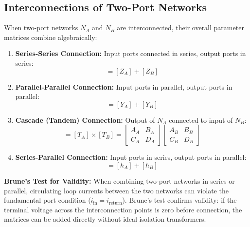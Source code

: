 \documentclass[12pt,a4paper]{article}
\begin{document}
\subsection{Interconnections of Two-Port Networks}

When two-port networks $N_A$ and $N_B$ are interconnected, their overall parameter matrices combine algebraically:

\begin{tcolorbox}[defbox, title={\textbf{Combination Rules for Interconnected Two-Ports}}]
\begin{enumerate}[leftmargin=*]
  \item \textbf{Series-Series Connection:} Input ports connected in series, output ports in series:
  \begin{equation}
    [Z] = [Z_A] + [Z_B]
  \end{equation}
  \item \textbf{Parallel-Parallel Connection:} Input ports in parallel, output ports in parallel:
  \begin{equation}
    [Y] = [Y_A] + [Y_B]
  \end{equation}
  \item \textbf{Cascade (Tandem) Connection:} Output of $N_A$ connected to input of $N_B$:
  \begin{equation}
    [T] = [T_A] \times [T_B] = \begin{bmatrix} A_A & B_A \\ C_A & D_A \end{bmatrix} \begin{bmatrix} A_B & B_B \\ C_B & D_B \end{bmatrix}
  \end{equation}
  \item \textbf{Series-Parallel Connection:} Input ports in series, output ports in parallel:
  \begin{equation}
    [h] = [h_A] + [h_B]
  \end{equation}
\end{enumerate}
\textbf{Brune's Test for Validity:} When combining two-port networks in series or parallel, circulating loop currents between the two networks can violate the fundamental port condition ($i_{\text{in}} = i_{\text{return}}$). Brune's test confirms validity: if the terminal voltage across the interconnection points is zero before connection, the matrices can be added directly without ideal isolation transformers.
\end{tcolorbox}
\end{document}
